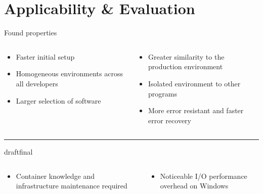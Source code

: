\documentclass{beamer}
\def\final{final}
\def\status{draft}
\begin{document}
\section{Applicability \& Evaluation}
\begin{frame}{}
  \vspace{-.5cm}
  \begin{center}
    \Large Found properties
  \end{center}
  \begin{columns}
    \begin{column}{0.5\textwidth}
      \begin{itemize}
        \setlength\itemsep{0.6em}
        \item Faster initial setup
        \item Homogeneous environments across all developers
        \item Larger selection of software
      \end{itemize}
    \end{column}
    \begin{column}{0.5\textwidth}
      \begin{itemize}
        \setlength\itemsep{0.6em}
        \item Greater similarity to the production environment
        \item Isolated environment to other programs
        \item More error resistant and faster error recovery
      \end{itemize}
    \end{column}
  \end{columns}

  \vspace{.5cm}
  {\color{uos-red-full}\rule{\textwidth}{1.5pt}}

  \ifx\status\final{}
    \pause{}
  \fi


  \begin{columns}
    \begin{column}{0.5\textwidth}
      \begin{itemize}
        \setlength\itemsep{0.6em}
        \item Container knowledge and infrastructure maintenance required
      \end{itemize}
    \end{column}
    \begin{column}{0.5\textwidth}
      \begin{itemize}
        \setlength\itemsep{0.6em}
        \item Noticeable I/O performance overhead on Windows
      \end{itemize}
    \end{column}
  \end{columns}
\end{frame}
\end{document}
